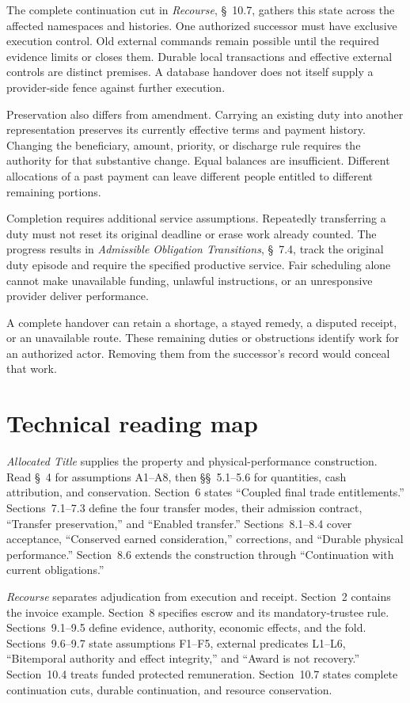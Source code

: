 \documentclass{momentum}
\begin{document}
The complete continuation cut in \emph{Recourse}, \S~10.7, gathers this state across the affected namespaces and histories. One authorized successor must have exclusive execution control. Old external commands remain possible until the required evidence limits or closes them. Durable local transactions and effective external controls are distinct premises. A database handover does not itself supply a provider-side fence against further execution.

Preservation also differs from amendment. Carrying an existing duty into another representation preserves its currently effective terms and payment history. Changing the beneficiary, amount, priority, or discharge rule requires the authority for that substantive change. Equal balances are insufficient. Different allocations of a past payment can leave different people entitled to different remaining portions.

Completion requires additional service assumptions. Repeatedly transferring a duty must not reset its original deadline or erase work already counted. The progress results in \emph{Admissible Obligation Transitions}, \S~7.4, track the original duty episode and require the specified productive service. Fair scheduling alone cannot make unavailable funding, unlawful instructions, or an unresponsive provider deliver performance.

A complete handover can retain a shortage, a stayed remedy, a disputed receipt, or an unavailable route. These remaining duties or obstructions identify work for an authorized actor. Removing them from the successor's record would conceal that work.

\section{Technical reading map}

\emph{Allocated Title} supplies the property and physical-performance construction. Read \S~4 for assumptions A1--A8, then \S\S~5.1--5.6 for quantities, cash attribution, and conservation. Section~6 states ``Coupled final trade entitlements.'' Sections~7.1--7.3 define the four transfer modes, their admission contract, ``Transfer preservation,'' and ``Enabled transfer.'' Sections~8.1--8.4 cover acceptance, ``Conserved earned consideration,'' corrections, and ``Durable physical performance.'' Section~8.6 extends the construction through ``Continuation with current obligations.''

\emph{Recourse} separates adjudication from execution and receipt. Section~2 contains the invoice example. Section~8 specifies escrow and its mandatory-trustee rule. Sections~9.1--9.5 define evidence, authority, economic effects, and the fold. Sections~9.6--9.7 state assumptions F1--F5, external predicates L1--L6, ``Bitemporal authority and effect integrity,'' and ``Award is not recovery.'' Section~10.4 treats funded protected remuneration. Section~10.7 states complete continuation cuts, durable continuation, and resource conservation.
\end{document}
